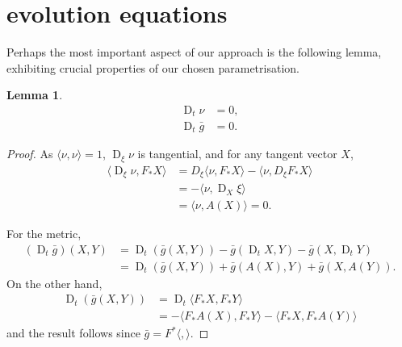 \documentclass{amsart}
\newtheorem{lemma}[theorem]{Lemma}
\theoremstyle{definition}
\theoremstyle{remark}
\newcommand{\ip}[2]{\ensuremath{\langle{#1},{#2}\rangle}}
\DeclareMathOperator{\D}{D}
\numberwithin{equation}{section}
\begin{document}
\section{evolution equations}

Perhaps the most important aspect of our approach is the following lemma, exhibiting crucial properties of our chosen parametrisation.

\begin{lemma}
\begin{align}
\D_t \nu & = 0, \\
\D_t \bar{g} &= 0.
\end{align}
\end{lemma}

\begin{proof}
As $\ip{\nu}{\nu} = 1$, $\D_{\xi} \nu$ is tangential, and for any tangent vector $X$,
\[
\begin{split}
\ip{\D_{\xi} \nu}{F_{\ast} X} &= D_{\xi} \ip{\nu}{F_{\ast}X} - \ip{\nu}{D_{\xi} F_{\ast} X} \\
&= -\ip{\nu}{\D_{X}\xi} \\
&= \ip{\nu}{A(X)} = 0.
\end{split}
\]

For the metric,
\[
\begin{split}
\left(\D_t \bar{g}\right) (X, Y) &= \D_t (\bar{g}(X, Y)) - \bar{g}(\D_t X, Y) - \bar{g}(X, \D_t Y) \\
&= \D_t (\bar{g}(X, Y)) + \bar{g}(A(X), Y) + \bar{g}(X, A(Y)).
\end{split}
\]
On the other hand,
\[
\begin{split}
\D_t (\bar{g}(X, Y)) &= \D_t \ip{F_{\ast} X}{F_{\ast} Y} \\
&= -\ip{F_{\ast} A(X)}{F_{\ast} Y} - \ip{F_{\ast} X}{F_{\ast} A(Y)}
\end{split}
\]
and the result follows since $\bar{g} = F^{\ast} \ip{}{}$.
\end{proof}
\end{document}

